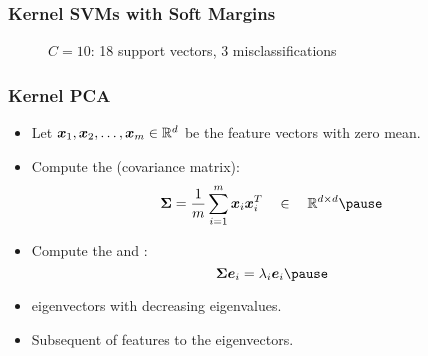 \begin{frame}
	\frametitle{Kernel SVMs with Soft Margins \cont}


	\begin{figure}
		\centering
		\caption{$C=10$: 18 support vectors, 3 misclassifications}
	\end{figure}
\end{frame}




\begin{frame}
	\frametitle{Kernel PCA}

	 \pause

	\begin{itemize}
		\item Let ${\bm x}_1, {\bm x}_2, \dots, {\bm x}_m\in \mathbb{R}^d$ be the feature vectors with zero mean. \pause
		\item Compute the  (covariance matrix):
		      \begin{displaymath}
			      \mat \Sigma =
			      \frac{1}{m}\sum_{i=1}^m \vec x_i \vec x_i^T \quad
			      \in \quad \real^{d\times d} \pause
		      \end{displaymath}
		\item Compute the  and :
		      \begin{displaymath}
			      \mat \Sigma \vec e_i = \lambda_i \vec e _i \pause
		      \end{displaymath}
		\item {} eigenvectors with decreasing eigenvalues. \pause
		\item Subsequent  of features to the eigenvectors.
	\end{itemize}
\end{frame}



